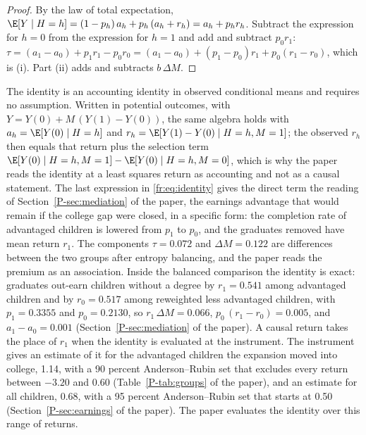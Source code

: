 \begin{proof}
By the law of total expectation, $\E[Y \mid H = h] = (1 - p_h)\,a_h + p_h\,(a_h + r_h) = a_h + p_h r_h$. Subtract the expression for $h = 0$
from the expression for $h = 1$ and add and subtract $p_0 r_1$:
$\tau = (a_1 - a_0) + p_1 r_1 - p_0 r_0 = (a_1 - a_0) + (p_1 - p_0)r_1 + p_0(r_1 - r_0)$,
which is (i). Part (ii) adds and subtracts $b\,\Delta M$.
\end{proof}

The identity is an accounting identity in observed conditional means and
requires no assumption. Written in potential outcomes, with
$Y = Y(0) + M\,(Y(1) - Y(0))$, the same algebra holds with
$a_h = \E[Y(0) \mid H = h]$ and $r_h = \E[Y(1) - Y(0) \mid H = h, M = 1]$;
the observed $r_h$ then equals that return plus the selection term
$\E[Y(0) \mid H = h, M = 1] - \E[Y(0) \mid H = h, M = 0]$, which is why the
paper reads the identity at a least squares return as accounting and not as
a causal statement. The last expression in \eqref{fr:eq:identity} gives the
direct term the reading of Section~\ref{P-sec:mediation} of the paper, the
earnings advantage that would remain if the college gap were closed, in a
specific form: the completion rate of advantaged children is lowered from
$p_1$ to $p_0$, and the graduates removed have mean return $r_1$. The
components $\tau = 0.072$ and $\Delta M = 0.122$ are differences between
the two groups after entropy balancing, and the paper reads the premium
as an association. Inside the balanced comparison the identity is exact:
graduates out-earn children without a degree by $r_1 = 0.541$ among
advantaged children and by $r_0 = 0.517$ among reweighted less advantaged
children, with $p_1 = 0.3355$ and $p_0 = 0.2130$, so
$r_1\,\Delta M = 0.066$, $p_0\,(r_1 - r_0) = 0.005$, and
$a_1 - a_0 = 0.001$ (Section~\ref{P-sec:mediation} of the paper). A causal
return takes the place of $r_1$ when the identity is evaluated at the
instrument. The instrument gives an estimate of it for the advantaged
children the expansion moved into college, 1.14, with a 90 percent
Anderson--Rubin set that excludes every return between $-3.20$ and 0.60
(Table~\ref{P-tab:groups} of the paper), and an estimate for all children,
0.68, with a 95 percent Anderson--Rubin set that starts at 0.50
(Section~\ref{P-sec:earnings} of the paper). The paper evaluates the identity
over this range of returns.

